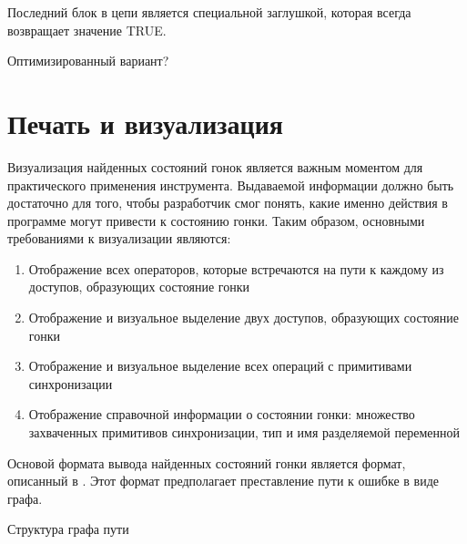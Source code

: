 Последний блок в цепи является специальной заглушкой, которая всегда возвращает значение TRUE.

Оптимизированный вариант?

\section{Печать и визуализация} \label{sect_impl_visualization}

Визуализация найденных состояний гонок является важным моментом для практического применения инструмента.
Выдаваемой информации должно быть достаточно для того, чтобы разработчик смог понять, какие именно действия в программе могут привести к состоянию гонки.
Таким образом, основными требованиями к визуализации являются:

\begin{enumerate}

\item Отображение всех операторов, которые встречаются на пути к каждому из доступов, образующих состояние гонки

\item Отображение и визуальное выделение двух доступов, образующих состояние гонки

\item Отображение и визуальное выделение всех операций с примитивами синхронизации

\item Отображение справочной информации о состоянии гонки: множество захваченных примитивов синхронизации, тип и имя разделяемой переменной

\end{enumerate}

Основой формата вывода найденных состояний гонки является формат, описанный в .
Этот формат предполагает преставление пути к ошибке в виде графа.


Структура графа пути


\clearpage